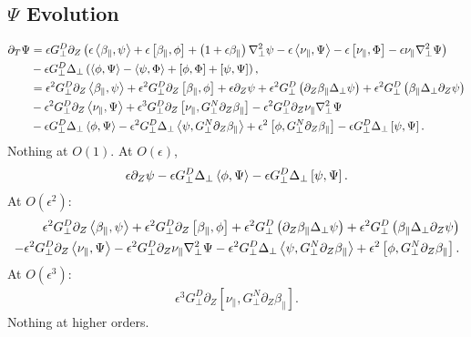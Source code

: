 \documentclass{article}
\newcommand{\para}{\parallel}
\newcommand{\ep}{\epsilon}
\newcommand{\np}{\nabla_\perp}
\newcommand{\lap}{\Delta_\perp}
\newcommand{\p}{\partial}
\newcommand{\GN}{G_\perp^N}
\newcommand{\GD}{G_\perp^D}
\newcommand{\pth} [1] {\left( #1 \right) }
\newcommand{\br} [1] {\left[ #1 \right] }
\begin{document}
\subsection{$\Psi$ Evolution}
\begin{align*}
    \p_T\Psi &= \ep\GD\p_Z\pth{\ep\Braket{\beta_\para, \psi} +  \ep\br{\beta_\para, \phi} + \pth{1+\ep\beta_\para}\np^2\psi - \ep\Braket{\nu_\para, \Psi} - \ep\br{\nu_\para, \Phi} - \ep\nu_\para\np^2\Psi} \nonumber\\ 
    &- \ep\GD\lap\pth{\Braket{\phi, \Psi} - \Braket{\psi, \Phi} + \br{\phi, \Phi} + \br{\psi, \Psi}}, \\ 
    &= \ep^2\GD\p_Z \Braket{\beta_\para, \psi} +  \ep^2\GD\p_Z \br{\beta_\para, \phi} + \ep\p_Z\psi + \ep^2\GD\pth{\p_Z\beta_\para\lap\psi} + \ep^2\GD\pth{\beta_\para\lap\p_Z\psi} \\ 
    &- \ep^2\GD\p_Z\Braket{\nu_\para, \Psi} + \ep^3\GD\p_Z\br{\nu_\para, \GN\p_Z\beta_\para} - \ep^2\GD\p_Z\nu_\para\np^2\Psi \\ 
    &- \ep\GD\lap\Braket{\phi, \Psi} - \ep^2\GD\lap\Braket{\psi, \GN\p_Z\beta_\para} + \ep^2\br{\phi, \GN\p_Z\beta_\para} - \ep\GD\lap\br{\psi, \Psi}. 
\end{align*}
Nothing at $O(1)$. At $O(\ep)$, 
\begin{align*}
    \ep\p_Z\psi - \ep\GD\lap\Braket{\phi, \Psi} - \ep\GD\lap\br{\psi, \Psi}. 
\end{align*}
At $O\pth{\ep^2}$: 
\begin{align*}
    \ep^2\GD\p_Z \Braket{\beta_\para, \psi} +  \ep^2\GD\p_Z \br{\beta_\para, \phi} + \ep^2\GD\pth{\p_Z\beta_\para\lap\psi} + \ep^2\GD\pth{\beta_\para\lap\p_Z\psi} \\ 
    - \ep^2\GD\p_Z\Braket{\nu_\para, \Psi}  - \ep^2\GD\p_Z\nu_\para\np^2\Psi -\ep^2\GD\lap\Braket{\psi, \GN\p_Z\beta_\para} + \ep^2\br{\phi, \GN\p_Z\beta_\para}. 
\end{align*}
At $O\pth{\ep^3}$: 
\begin{align*}
    \ep^3\GD\p_Z\br{\nu_\para, \GN\p_Z\beta_\para}. 
\end{align*}
Nothing at higher orders. 
\end{document}
